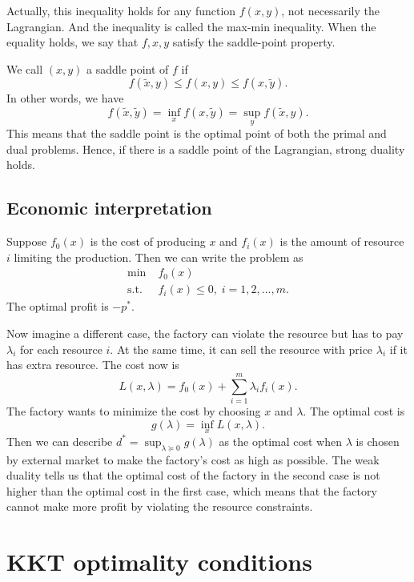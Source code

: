 \documentclass[lang=en,color=blue,mode=fancy,titlestyle=hang]{elegantbook}
\begin{document}
Actually, this inequality holds for any function $f(x, y)$, not necessarily the Lagrangian.
And the inequality is called the max-min inequality. When the equality holds, we say that
$f, x, y$ satisfy the saddle-point property.

We call $(x, y)$ a saddle point of $f$ if
\[
f(\tilde{x}, y) \leq f(x, y) \leq f(x, \tilde{y}).
\]
In other words, we have
\[
f(\tilde{x}, \tilde{y}) = \inf_{x} f(x, \tilde{y}) = \sup_{y} f(\tilde{x}, y).
\]
This means that the saddle point is the optimal point of both the primal and dual problems.
Hence, if there is a saddle point of the Lagrangian, strong duality holds.

\subsection{Economic interpretation}
Suppose $f_0(x)$ is the cost of producing $x$ and $f_i(x)$ is the amount of resource $i$
limiting the production. Then we can write the problem as
\begin{align*}
\min \; &f_0(x)\\
\text{s.t.} \; &f_i(x) \leq 0, \; i = 1, 2, \ldots, m.
\end{align*}
The optimal profit is $-p^*$.

Now imagine a different case, the factory can violate the resource but has to pay $\lambda_i$
for each resource $i$. At the same time, it can sell the resource with price $\lambda_i$ if
it has extra resource. The cost now is
\[
L(x, \lambda) = f_0(x) + \sum_{i=1}^m \lambda_i f_i(x).
\]
The factory wants to minimize the cost by choosing $x$ and $\lambda$. The optimal cost is
\[
g(\lambda) = \inf_{x} L(x, \lambda).
\]
Then we can describe $d^* = \sup_{\lambda \succeq 0} g(\lambda)$ as the optimal cost when
$\lambda$ is chosen by external market to make the factory's cost as high as possible.
The weak duality tells us that the optimal cost of the factory in the second case is not
higher than the optimal cost in the first case, which means that the factory cannot make
more profit by violating the resource constraints.

\section{KKT optimality conditions}
\end{document}

